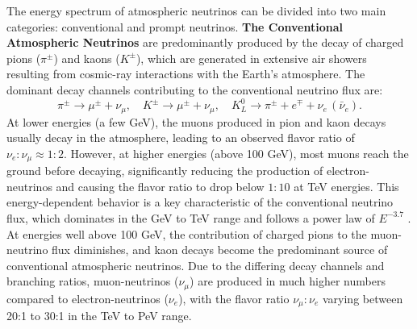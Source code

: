 The energy spectrum of atmospheric neutrinos can be divided into two main categories: conventional and prompt neutrinos. \textbf{The Conventional Atmospheric Neutrinos} are predominantly produced by the decay of charged pions (\(\pi^\pm\)) and kaons (\(K^\pm\)), which are generated in extensive air showers resulting from cosmic-ray interactions with the Earth's atmosphere. The dominant decay channels contributing to the conventional neutrino flux are:
\[
\pi^\pm \rightarrow \mu^\pm + \nu_\mu, \quad K^\pm \rightarrow \mu^\pm + \nu_\mu, \quad K_L^0 \rightarrow \pi^\pm + e^\mp + \nu_e \, (\bar{\nu}_e).
\]
At lower energies (a few GeV), the muons produced in pion and kaon decays usually decay in the atmosphere, leading to an observed flavor ratio of \(\nu_e : \nu_\mu \approx 1:2\). However, at higher energies (above 100 GeV), most muons reach the ground before decaying, significantly reducing the production of electron-neutrinos and causing the flavor ratio to drop below \(1:10\) at TeV energies. This energy-dependent behavior is a key characteristic of the conventional neutrino flux, which dominates in the GeV to TeV range and follows a power law of \(E^{-3.7}\) \cite{PDG_2024}. At energies well above 100 GeV, the contribution of charged pions to the muon-neutrino flux diminishes, and kaon decays become the predominant source of conventional atmospheric neutrinos. Due to the differing decay channels and branching ratios, muon-neutrinos (\(\nu_\mu\)) are produced in much higher numbers compared to electron-neutrinos (\(\nu_e\)), with the flavor ratio \(\nu_\mu : \nu_e\) varying between 20:1 to 30:1 in the TeV to PeV range. 


